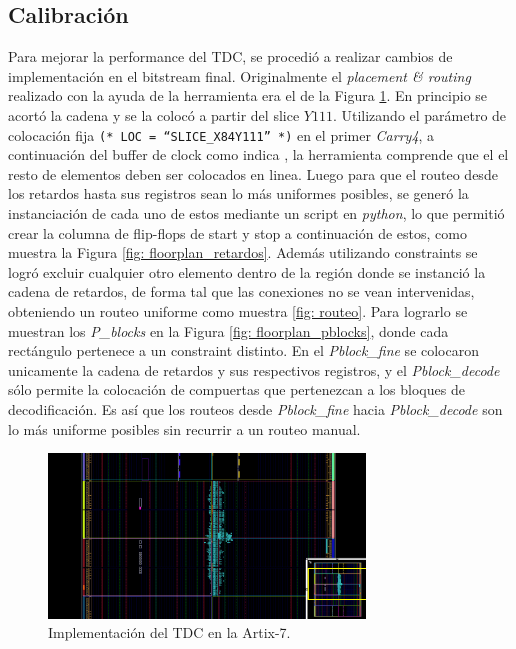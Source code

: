  \subsection{Calibración}
 Para mejorar la performance del TDC, se procedió a realizar cambios de implementación en el bitstream final. Originalmente 
 el \textit{placement \& routing} realizado con la ayuda de la herramienta era el de la Figura \ref{fig: floorplan_0}. En principio se acortó la cadena y se la colocó a partir del slice $Y111$. Utilizando
 el parámetro de colocación fija \texttt{(* LOC = ``SLICE\_X84Y111'' *)} en el primer \textit{Carry4}, a continuación del buffer 
 de clock como indica \cite{machado_novel_2018}, la herramienta comprende que el el resto de elementos deben ser colocados en linea. 
 Luego para que el routeo desde 
 los retardos hasta sus registros sean lo más uniformes posibles, se generó la instanciación de cada uno de estos mediante un script en
 \textit{python}, lo que permitió crear la columna de flip-flops de start y stop a continuación de estos, como muestra la Figura \ref{fig: floorplan_retardos}.
 Además utilizando constraints se logró excluir cualquier otro elemento dentro de la región donde se instanció la cadena de retardos,
 de forma tal que las conexiones no se vean intervenidas, obteniendo un routeo uniforme como muestra \ref{fig: routeo}. 
 Para lograrlo se muestran los \textit{P\_blocks} en la Figura \ref{fig: floorplan_pblocks}, donde cada
 rectángulo pertenece a un constraint distinto. En el \textit{Pblock\_fine} se colocaron
 unicamente la cadena de retardos y sus respectivos registros, y el \textit{Pblock\_decode} sólo permite la colocación de compuertas que 
 pertenezcan a los bloques de decodificación. Es así que los routeos desde \textit{Pblock\_fine} hacia \textit{Pblock\_decode} son lo más
 uniforme posibles sin recurrir a un routeo manual.

 \begin{figure}[H]
      \centering
      \includegraphics[width=0.75\textwidth]{imagenes/floorplan_0.png}
      \caption{Implementación del TDC en la Artix-7.}
      \label{fig: floorplan_0}
 \end{figure}

